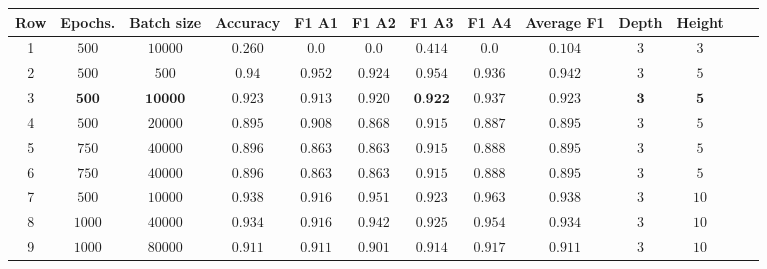             
            \begin{table}[]
                \centering
                \begin{tabular}{|c|c|c|c|c|c|c|c|c|c|c|c|c|}
                    \hline
                Row  &Epochs. & Batch size    & Accuracy  &F1 A1      &F1 A2      &F1 A3      &F1 A4      & Average F1    &  Depth    & Height  \\ \hline
                1&     $500$  & $10000$       & $0.260$   & $0.0$     & $0.0$     & $0.414$   & $0.0$     & $0.104$       & $3$       & $3$     \\ \hline
                2&     $500$  & $500$         & $0.94$    & $0.952$   & $0.924$   & $0.954$   & $0.936$   & $0.942$       & $3$       & $5$     \\ \hline
                3&     $\bm{500}$  & $\bm{10000}$   & $\bm{0.923}$  & $\bm{0.913}$  & $\bm{0.920}$   & $\textbf{0.922}$   & $\bm{0.937}$   & $\bm{0.923}$ & $\bm3$       & $\bm5$     \\ \hline
                4&     $500$  & $20000$       & $0.895$   & $0.908$   & $0.868$   & $0.915$   & $0.887$   & $0.895$       & $3$       & $5$     \\ \hline
                5&     $750$  & $40000$       & $0.896$   & $0.863$   & $0.863$   & $0.915$   & $0.888$   & $0.895$       & $3$       & $5$     \\ \hline
                6&     $750$  & $40000$       & $0.896$   & $0.863$   & $0.863$   & $0.915$   & $0.888$   & $0.895$       & $3$       & $5$     \\ \hline
                7&     $500$  & $10000$       & $0.938$   & $0.916$   & $0.951$   & $0.923$   & $0.963$   & $0.938$       & $3$       & $10$     \\ \hline
                8&     $1000$ & $40000$       & $0.934$   & $0.916$   & $0.942$   & $0.925$   & $0.954$   & $0.934$       & $3$       & $10$     \\ \hline
                9&     $1000$ & $80000$       & $0.911$   & $0.911$   & $0.901$   & $0.914$   & $0.917$   & $0.911$       & $3$       & $10$     \\ \hline

\end{tabular}
\end{table}
